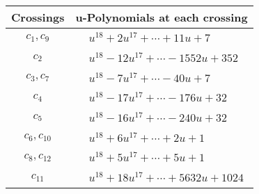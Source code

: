 \documentclass[1p]{elsarticle_modified}
\theoremstyle{definition}
\begin{document}
\begin{tabular}{m{50pt}|m{274pt}}
Crossings & \hspace{64pt}u-Polynomials at each crossing \\
\hline $$\begin{aligned}c_{1},c_{9}\end{aligned}$$&$\begin{aligned}
&u^{18}+2 u^{17}+\cdots+11 u+7
\end{aligned}$\\
\hline $$\begin{aligned}c_{2}\end{aligned}$$&$\begin{aligned}
&u^{18}-12 u^{17}+\cdots-1552 u+352
\end{aligned}$\\
\hline $$\begin{aligned}c_{3},c_{7}\end{aligned}$$&$\begin{aligned}
&u^{18}-7 u^{17}+\cdots-40 u+7
\end{aligned}$\\
\hline $$\begin{aligned}c_{4}\end{aligned}$$&$\begin{aligned}
&u^{18}-17 u^{17}+\cdots-176 u+32
\end{aligned}$\\
\hline $$\begin{aligned}c_{5}\end{aligned}$$&$\begin{aligned}
&u^{18}-16 u^{17}+\cdots-240 u+32
\end{aligned}$\\
\hline $$\begin{aligned}c_{6},c_{10}\end{aligned}$$&$\begin{aligned}
&u^{18}+6 u^{17}+\cdots+2 u+1
\end{aligned}$\\
\hline $$\begin{aligned}c_{8},c_{12}\end{aligned}$$&$\begin{aligned}
&u^{18}+5 u^{17}+\cdots+5 u+1
\end{aligned}$\\
\hline $$\begin{aligned}c_{11}\end{aligned}$$&$\begin{aligned}
&u^{18}+18 u^{17}+\cdots+5632 u+1024
\end{aligned}$\\
\hline
\end{tabular}\\~\\
\end{document}
